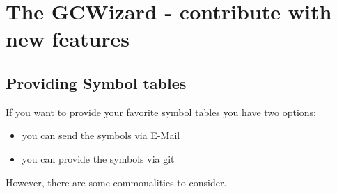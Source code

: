 \chapter{The GCWizard - contribute with new features}

\section{Providing Symbol tables}
If you want to provide your favorite symbol tables you have two options:
\begin{itemize}
    \item you can send the symbols via E-Mail
    \item you can provide the symbols via git
\end{itemize}
However, there are some commonalities to consider.

